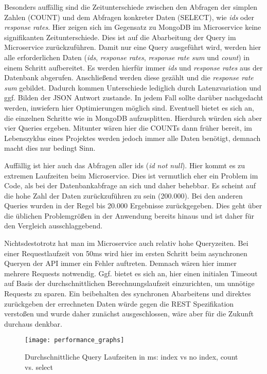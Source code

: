 Besonders auffällig sind die Zeitunterschiede zwischen den Abfragen der simplen Zahlen (COUNT) und dem Abfragen konkreter Daten (SELECT), wie \textit{ids} oder \textit{response rates}. Hier zeigen sich im Gegensatz zu MongoDB im Microservice keine signifikanten Zeitunterschiede. Dies ist auf die Abarbeitung der Query im Microservice zurückzuführen. Damit nur eine Query ausgeführt wird, werden hier alle erforderlichen Daten (\textit{ids}, \textit{response rates}, \textit{response rate sum} und \textit{count}) in einem Schritt aufbereitet. Es werden hierfür immer \textit{ids} und \textit{response rates} aus der Datenbank abgerufen. Anschließend werden diese gezählt und die \textit{response rate sum} gebildet. Dadurch kommen Unterschiede lediglich durch Latenzvariation und ggf. Bilden der JSON Antwort zustande.
In jedem Fall sollte darüber nachgedacht werden, inwiefern hier Optimierungen möglich sind. Eventuell bietet es sich an, die einzelnen Schritte wie in MongoDB aufzusplitten. Hierdurch würden sich aber vier Queries ergeben. Mitunter wären hier die COUNTs dann früher bereit, im Lebenszyklus eines Projektes werden jedoch immer alle Daten benötigt, demnach macht dies nur bedingt Sinn. 

Auffällig ist hier auch das Abfragen aller ids (\textit{id not null}). Hier kommt es zu extremen Laufzeiten beim Microservice. Dies ist vermutlich eher ein Problem im Code, als bei der Datenbankabfrage an sich und daher behebbar. Es scheint auf die hohe Zahl der Daten zurückzuführen zu sein (200.000). Bei den anderen Queries wurden in der Regel bis 20.000 Ergebnisse zurückgegeben. Dies geht über die üblichen Problemgrößen in der Anwendung bereits hinaus und ist daher für den Vergleich ausschlaggebend.

Nichtsdestotrotz hat man im Microservice auch relativ hohe Queryzeiten. Bei einer Requestlaufzeit von 50ms wird hier im ersten Schritt beim asynchronen Queryen der API immer ein Fehler auftreten. Demnach wären hier immer mehrere Requests notwendig. Ggf. bietet es sich an, hier einen initialen Timeout auf Basis der durchschnittlichen Berechnungslaufzeit einzurichten, um unnötige Requests zu sparen. Ein beibehalten des synchronen Abarbeitens und direktes zurückgeben der errechneten Daten würde gegen die REST Spezifikation verstoßen und wurde daher zunächst ausgeschlossen, wäre aber für die Zukunft durchaus denkbar.

\begin{figure}[!ht]
    \centering
    \caption{Durchschnittliche Query Laufzeiten in ms: index vs no index, count vs. select}
    \label{fig:perftestgraph}
    \texttt{[image: performance\_graphs]}
\end{figure}

